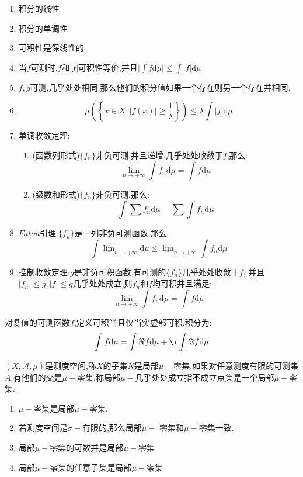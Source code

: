 \begin{enumerate}
  \item 积分的线性
  \item 积分的单调性
  \item 可积性是保线性的
  \item 当$f$可测时,$f$和$|f|$可积性等价,并且$\mid\int f\mathrm{d}\mu\mid\le\int|f|\mathrm{d}\mu$
  \item $f,g$可测,几乎处处相同,那么他们的积分值如果一个存在则另一个存在并相同.
  \item $$\mu\left(\left\{x\in X:|f(x)|\ge\frac{1}{\lambda}\right\}\right)\le\lambda\int|f|\mathrm{d}\mu$$
  \item 单调收敛定理:
  \begin{enumerate}
  \item (函数列形式)$\{f_n\}$非负可测,并且递增,几乎处处收敛于$f$,那么:
  $$\lim_{n\to+\infty}\int f_n\mathrm{d}\mu=\int f\mathrm{d}\mu$$
  \item (级数和形式)$\{f_n\}$非负可测,那么:
  $$\int\sum f_n\mathrm{d}\mu=\sum\int f_n\mathrm{d}\mu$$
  \end{enumerate}
  \item $Fatou$引理:$\{f_n\}$是一列非负可测函数,那么:
  $$\int \underline{\lim}_{n\to+\infty}\mathrm{d}\mu\le\underline{\lim}_{n\to+\infty}\int f_n\mathrm{d}\mu$$
  \item 控制收敛定理:$g$是非负可积函数,有可测的$\{f_n\}$几乎处处收敛于$f$, 并且$|f_n|\le g,|f|\le g$几乎处处成立,则$f_n$和$f$均可积并且满足:
      $$\lim_{n\to+\infty}\int f_n\mathrm{d}\mu=\int f\mathrm{d}\mu$$
\end{enumerate}

对复值的可测函数$f$,定义可积当且仅当实虚部可积,积分为:
$$\int f\mathrm{d}\mu=\int \Re f\mathrm{d}\mu+\i\int\Im f\mathrm{d}\mu$$

$(X,\mathscr{A},\mu)$是测度空间,称$X$的子集$N$是局部$\mu-$零集,如果对任意测度有限的可测集$A$,有他们的交是$\mu-$零集.称局部$\mu-$几乎处处成立指不成立点集是一个局部$\mu-$零集.

\begin{enumerate}
  \item $\mu-$零集是局部$\mu-$零集.
  \item 若测度空间是$\sigma-$有限的,那么局部$\mu-$ 零集和$\mu-$零集一致.
  \item 局部$\mu-$零集的可数并是局部$\mu-$零集
  \item 局部$\mu-$零集的任意子集是局部$\mu-$零集
\end{enumerate}

